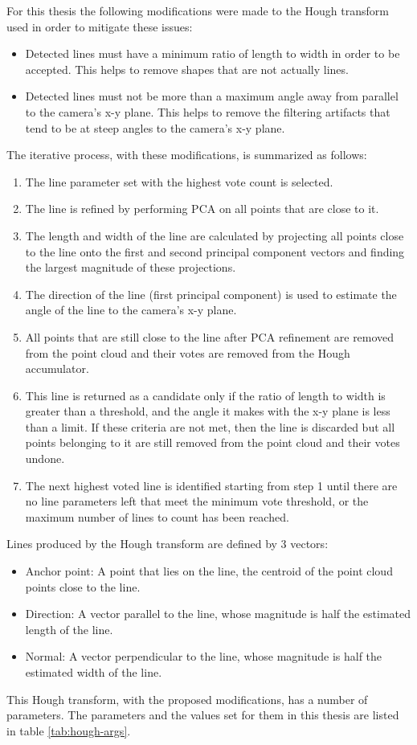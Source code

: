 For this thesis the following modifications were made to the Hough transform used in order to mitigate these issues:
\begin{itemize}
    \item Detected lines must have a minimum ratio of length to width in order to be accepted. This helps to remove shapes
        that are not actually lines.
    \item Detected lines must not be more than a maximum angle away from parallel to the camera's x-y plane. This helps to remove
        the filtering artifacts that tend to be at steep angles to the camera's x-y plane.
\end{itemize}

The iterative process, with these modifications, is summarized as follows:
\begin{enumerate}
    \item The line parameter set with the highest vote count is selected.
    \item The line is refined by performing PCA on all points that are close to it.
    \item The length and width of the line are calculated by projecting all points close to the line onto 
        the first and second principal component vectors and finding the largest magnitude of these projections.
    \item The direction of the line (first principal component) is used to estimate the angle of the line to 
        the camera's x-y plane.
    \item All points that are still close to the line after PCA refinement are removed from the point cloud and
        their votes are removed from the Hough accumulator.
    \item This line is returned as a candidate only if the ratio of length to width is greater than a threshold, and 
        the angle it makes with the x-y plane is less than a limit. If these criteria are not met, then the line is discarded
        but all points belonging to it are still removed from the point cloud and their votes undone.
    \item The next highest voted line is identified starting from step 1 until there are no line parameters left that
        meet the minimum vote threshold, or the maximum number of lines to count has been reached.
\end{enumerate}

Lines produced by the Hough transform are defined by 3 vectors:
\begin{itemize}
    \item Anchor point: A point that lies on the line, the centroid of the point cloud points close to the line.
    \item Direction: A vector parallel to the line, whose magnitude is half the estimated length of the line.
    \item Normal: A vector perpendicular to the line, whose magnitude is half the estimated width of the line.
\end{itemize}
This Hough transform, with the proposed modifications, has a number of parameters. The parameters and the values set for them 
in this thesis are listed in table \ref{tab:hough-args}.

